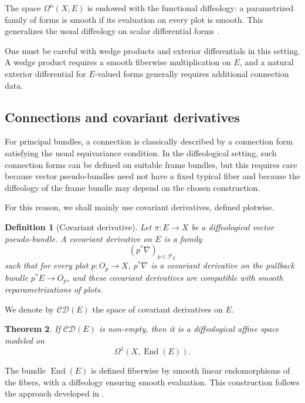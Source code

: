 \documentclass[11pt]{amsart}
\newtheorem{theorem}{Theorem}[section]
\newtheorem{definition}[theorem]{Definition}
\begin{document}
The space \(\Omega^n(X,E)\) is endowed with the functional diffeology: a parametrized family of forms is smooth if its evaluation on every plot is smooth. This generalizes the usual diffeology on scalar differential forms \cite{Ma2013}.

One must be careful with wedge products and exterior differentials in this setting. A wedge product requires a smooth fiberwise multiplication on \(E\), and a natural exterior differential for \(E\)-valued forms generally requires additional connection data.

\subsection{Connections and covariant derivatives}

For principal bundles, a connection is classically described by a connection form satisfying the usual equivariance condition. In the diffeological setting, such connection forms can be defined on suitable frame bundles, but this requires care because vector pseudo-bundles need not have a fixed typical fiber and because the diffeology of the frame bundle may depend on the chosen construction.

For this reason, we shall mainly use covariant derivatives, defined plotwise.

\begin{definition}[Covariant derivative]
Let \(\pi:E\to X\) be a diffeological vector pseudo-bundle. A \emph{covariant derivative} on \(E\) is a family
\[
(p^*\nabla)_{p\in\mathcal P_X}
\]
such that for every plot \(p:O_p\to X\), \(p^*\nabla\) is a covariant derivative on the pullback bundle \(p^*E\to O_p\), and these covariant derivatives are compatible with smooth reparametrizations of plots.
\end{definition}

We denote by \(\mathcal{CD}(E)\) the space of covariant derivatives on \(E\).

\begin{theorem}
If \(\mathcal{CD}(E)\) is non-empty, then it is a diffeological affine space modeled on
\[
\Omega^1(X,\operatorname{End}(E)).
\]
\end{theorem}

The bundle \(\operatorname{End}(E)\) is defined fiberwise by smooth linear endomorphisms of the fibers, with a diffeology ensuring smooth evaluation. This construction follows the approach developed in \cite{Magnot-Cauchy,MagnotConnections}.
\end{document}
